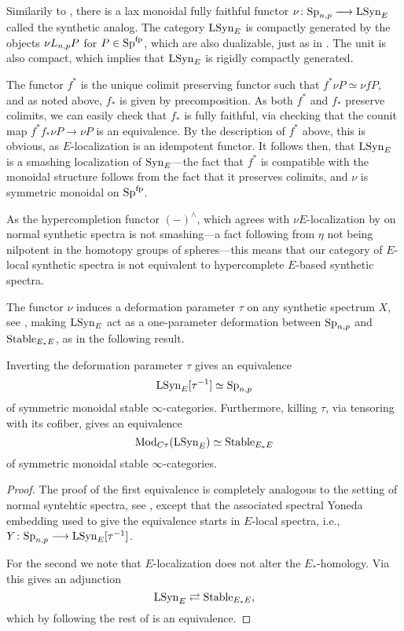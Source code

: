 Similarily to \cite[4.4, 4.38]{pstragowski_2022}, there is a lax monoidal fully faithful functor $\nu\colon\mathrm{Sp}_{n,p} \longrightarrow \mathrm{LSyn}_{E}$ called the synthetic analog. The category $\mathrm{LSyn}_{E}$ is compactly generated by the objects $\nu L_{n,p} P$ for $P\in \mathrm{Sp}^{\mathrm{fp}}$, which are also dualizable, just as in \cite[4.14]{pstragowski_2022}. The unit is also compact, which implies that $\mathrm{LSyn}_{E}$ is rigidly compactly generated. 

The functor $f^*$ is the unique colimit preserving functor such that $f^* \nu P \simeq \nu f P$, and as noted above, $f_*$ is given by precomposition. As both $f^*$ and $f_*$ preserve colimits, we can easily check that $f_*$ is fully faithful, via checking that the counit map $f^*f_* \nu P \to \nu P$ is an equivalence. By the description of $f^*$ above, this is obvious, as $E$-localization is an idempotent functor. It follows then, that $\mathrm{LSyn}_{E}$ is a smashing localization of $\mathrm{Syn}_{E}$---the fact that $f^*$ is compatible with the monoidal structure follows from the fact that it preserves colimits, and $\nu$ is symmetric monoidal on $\mathrm{Sp}^{\mathrm{fp}}$. 

\begin{remark}
    As the hypercompletion functor $(-)^\wedge$, which agrees with $\nu E$-localization by \cite[5.4]{pstragowski_2022} on normal synthetic spectra is not smashing---a fact following from $\eta$ not being nilpotent in the homotopy groups of spheres---this means that our category of $E$-local synthetic spectra is not equivalent to hypercomplete $E$-based synthetic spectra. 
\end{remark}

The functor $\nu$ induces a deformation parameter $\tau$ on any synthetic spectrum $X$, see \cite[Section 4.3]{pstragowski_2022}, making $\mathrm{LSyn}_{E}$ act as a one-parameter deformation between $\mathrm{Sp}_{n,p}$ and $\mathrm{Stable}_{E_*E}$, as in the following result. 

\begin{theorem}
    \label{ch3:add:thm:deformation-properties-of-syn}
    Inverting the deformation parameter $\tau$ gives an equivalence 
    \[\mathrm{LSyn}_{E}[\tau^{-1}]\simeq \mathrm{Sp}_{n,p}\]
    of symmetric monoidal stable $\infty$-categories. Furthermore, killing $\tau$, via tensoring with its cofiber, gives an equivalence 
    \[\mathrm{Mod}_{C\tau}(\mathrm{LSyn}_{E})\simeq \mathrm{Stable}_{E_*E}\]
    of symmetric monoidal stable $\infty$-categories. 
\end{theorem}
\begin{proof}
    The proof of the first equivalence is completely analogous to the setting of normal syntehtic spectra, see \cite[4.37, 4.40]{pstragowski_2022}, except that the associated spectral Yoneda embedding used to give the equivalence starts in $E$-local spectra, i.e., $Y\colon \mathrm{Sp}_{n,p} \longrightarrow \mathrm{LSyn}_{E}[\tau^{-1}]$. 

    For the second we note that $E$-localization does not alter the $E_*$-homology. Via \cite[2.22, 4.43]{pstragowski_2022} this gives an adjunction 
    \[\mathrm{LSyn}_{E} \rightleftarrows \mathrm{Stable}_{E_*E},\]
    which by following the rest of \cite[Section 4.5]{pstragowski_2022} is an equivalence. 
\end{proof}

